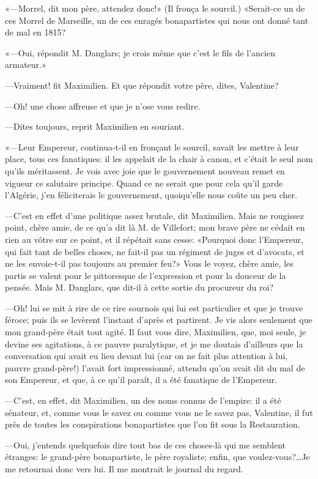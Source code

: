 «—Morrel, dit mon père, attendez donc!» (Il fronça le sourcil.) «Serait-ce un de ces Morrel de Marseille, un de ces enragés bonapartistes qui nous ont donné tant de mal en 1815? 

«—Oui, répondit M. Danglars; je crois même que c'est le fils de l'ancien armateur.» 

—Vraiment! fit Maximilien. Et que répondit votre père, dites, Valentine? 

—Oh! une chose affreuse et que je n'ose vous redire. 

—Dites toujours, reprit Maximilien en souriant. 

«—Leur Empereur, continua-t-il en fronçant le sourcil, savait les mettre à leur place, tous ces fanatiques: il les appelait de la chair à canon, et c'était le seul nom qu'ils méritassent. Je vois avec joie que le gouvernement nouveau remet en vigueur ce salutaire principe. Quand ce ne serait que pour cela qu'il garde l'Algérie, j'en féliciterais le gouvernement, quoiqu'elle nous coûte un peu cher. 

—C'est en effet d'une politique assez brutale, dit Maximilien. Mais ne rougissez point, chère amie, de ce qu'a dit là M. de Villefort; mon brave père ne cédait en rien au vôtre sur ce point, et il répétait sans cesse: «Pourquoi donc l'Empereur, qui fait tant de belles choses, ne fait-il pas un régiment de juges et d'avocats, et ne les envoie-t-il pas toujours au premier feu?» Vous le voyez, chère amie, les partis se valent pour le pittoresque de l'expression et pour la douceur de la pensée. Mais M. Danglars, que dit-il à cette sortie du procureur du roi? 

—Oh! lui se mit à rire de ce rire sournois qui lui est particulier et que je trouve féroce; puis ils se levèrent l'instant d'après et partirent. Je vis alors seulement que mon grand-père était tout agité. Il faut vous dire, Maximilien, que, moi seule, je devine ses agitations, à ce pauvre paralytique, et je me doutais d'ailleurs que la conversation qui avait eu lieu devant lui (car on ne fait plus attention à lui, pauvre grand-père!) l'avait fort impressionné, attendu qu'on avait dit du mal de son Empereur, et que, à ce qu'il paraît, il a été fanatique de l'Empereur. 

—C'est, en effet, dit Maximilien, un des noms connus de l'empire: il a été sénateur, et, comme vous le savez ou comme vous ne le savez pas, Valentine, il fut près de toutes les conspirations bonapartistes que l'on fit sous la Restauration. 

—Oui, j'entends quelquefois dire tout bas de ces choses-là qui me semblent étranges: le grand-père bonapartiste, le père royaliste; enfin, que voulez-vous?\dots Je me retournai donc vers lui. Il me montrait le journal du regard. 

